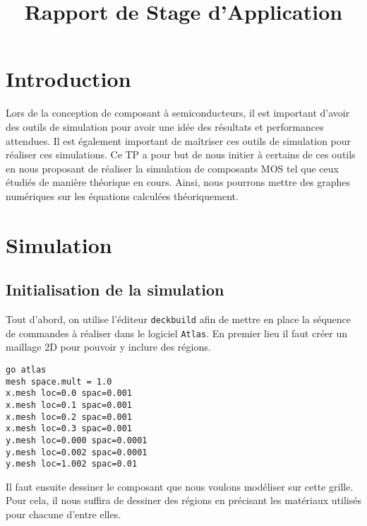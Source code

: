 \documentclass[a4paper,11pt]{report}
\title{Rapport de Stage d'Application}
\begin{document}


\chapter{Introduction}
Lors de la conception de composant à semiconducteurs, il est important d'avoir des outils de simulation pour avoir une idée des résultats et performances attendues. Il est également important de maîtriser ces outils de simulation pour réaliser ces simulations. Ce TP a pour but de nous initier à certains de ces outils en nous proposant de réaliser la simulation de composants MOS tel que ceux étudiés de manière théorique en cours. Ainsi, nous pourrons mettre des graphes  numériques sur les équations calculées théoriquement.

\chapter{Simulation}

\section{Initialisation de la simulation}

Tout d'abord, on utilise l'éditeur \texttt{deckbuild} afin de mettre en place la séquence de commandes à réaliser dans le logiciel \texttt{Atlas}. En premier lieu il faut créer un maillage 2D pour pouvoir y inclure des régions.


\noindent\texttt{go atlas\\mesh space.mult = 1.0\\x.mesh loc=0.0 spac=0.001\\x.mesh loc=0.1 spac=0.001\\x.mesh loc=0.2 spac=0.001\\x.mesh loc=0.3 spac=0.001\\y.mesh loc=0.000 spac=0.0001\\y.mesh loc=0.002 spac=0.0001\\y.mesh loc=1.002 spac=0.01\\}


Il faut ensuite dessiner le composant que nous voulons modéliser sur cette grille. Pour cela, il nous suffira de dessiner des régions en précisant les matériaux utilisés pour chacune d'entre elles.




\end{document}
